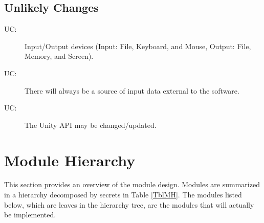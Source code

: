 \documentclass[12pt, titlepage]{article}
\newcounter{ucnum}
\newcommand{\uctheucnum}{UC\theucnum}
\begin{document}
\subsection{Unlikely Changes} \label{SecUchange}

\begin{description}
\item[ \uctheucnum \label{ucIO}:] Input/Output devices
  (Input: File, Keyboard, and Mouse, Output: File, Memory, and Screen).
\item[ \uctheucnum \label{ucInput}:] There will always be
  a source of input data external to the software.
\item[ \uctheucnum \label{ucAPI}:] The Unity API may be changed/updated.
\end{description}

\newpage 

\section{Module Hierarchy} \label{SecMH}

This section provides an overview of the module design. Modules are summarized
in a hierarchy decomposed by secrets in Table \ref{TblMH}. The modules listed
below, which are leaves in the hierarchy tree, are the modules that will
actually be implemented.
\end{document}
